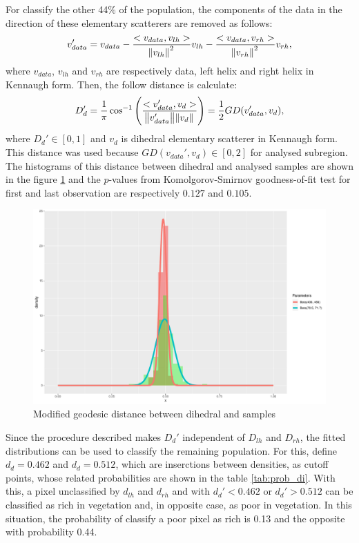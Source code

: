 \documentclass[12pt]{article}
\begin{document}
For classify the other 44\% of the population, the components of the data in the direction of these elementary scatterers are removed as follows:
\begin{equation}
  v_{data}' =  v_{data} - \frac{<v_{data}, v_{lh}>}{\norm{v_{lh}}^2} v_{lh} - \frac{<v_{data}, v_{rh}>}{\norm{v_{rh}}^2} v_{rh},
\end{equation}
where $v_{data}$, $v_{lh}$ and $v_{rh}$ are respectively data, left helix and right helix in Kennaugh form. Then, the follow distance is calculate:
\begin{equation}
  D_{d}' = \frac{1}{\pi} \cos^{-1}\left(\frac{<v_{data}', v_d>}{\norm{v_{data}'}\norm{v_d}}\right) = \frac{1}{2}GD(v_{data}', v_d),
\end{equation}
where $D_d' \in [0, 1]$ and $v_d$ is dihedral elementary scatterer in Kennaugh form. This distance was used because $GD(v_{data}', v_d) \in [0, 2]$ for analysed subregion. The histograms of this distance between dihedral and analysed samples are shown in the figure \ref{fig:hist_di} and the $p$-values from Komolgorov-Smirnov goodness-of-fit test for first and last observation are respectively $0.127$ and $0.105$. 
\begin{figure}[hbt]
  \centering
  \includegraphics[width = .5\linewidth]{Histograms/hist_mod_di}
  \caption{Modified geodesic distance between dihedral and samples}
  \label{fig:hist_di}
\end{figure}

Since the procedure described makes $D_d'$ independent of $D_{lh}$ and $D_{rh}$, the fitted distributions can be used to classify the remaining population. For this, 
define $d_d = 0.462$ and $d_d = 0.512$, which are inserctions between densities, as cutoff points, whose related probabilities are shown in the table \ref{tab:prob_di}.
With this, a pixel unclassified by $d_{lh}$ and $d_{rh}$ and with $d_d' < 0.462$ or $d_d' > 0.512$ can be classified as rich in vegetation and, in opposite case, as poor in vegetation. In this situation, the probability of classify a poor pixel as rich is 0.13 and the opposite with probability 0.44. 
\end{document}
